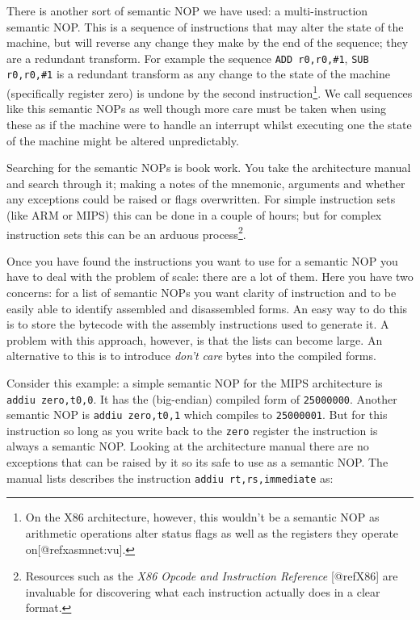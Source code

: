 \documentclass[10pt,]{book}
\begin{document}
There is another sort of semantic NOP we have used: a multi-instruction
semantic NOP. This is a sequence of instructions that may alter the
state of the machine, but will reverse any change they make by the end
of the sequence; they are a redundant transform. For example the
sequence \lstinline!ADD r0,r0,#1!, \lstinline!SUB r0,r0,#1! is a
redundant transform as any change to the state of the machine
(specifically register zero) is undone by the second
instruction\footnote{On the X86
  architecture\autocite{IntelCorporation:1997ta}, however, this wouldn't
  be a semantic NOP as arithmetic operations alter status flags as well
  as the registers they operate on{[}@refxasmnet:vu{]}.}. We call
sequences like this semantic NOPs as well though more care must be taken
when using these as if the machine were to handle an interrupt whilst
executing one the state of the machine might be altered unpredictably.

Searching for the semantic NOPs is book work. You take the architecture
manual and search through it; making a notes of the mnemonic, arguments
and whether any exceptions could be raised or flags overwritten. For
simple instruction sets (like ARM or MIPS) this can be done in a couple
of hours; but for complex instruction sets this can be an arduous
process\footnote{Resources such as the \emph{X86 Opcode and Instruction
  Reference} {[}@refX86{]} are invaluable for discovering what each
  instruction actually does in a clear format.}.

Once you have found the instructions you want to use for a semantic NOP
you have to deal with the problem of scale: there are a lot of them.
Here you have two concerns: for a list of semantic NOPs you want clarity
of instruction and to be easily able to identify assembled and
disassembled forms. An easy way to do this is to store the bytecode with
the assembly instructions used to generate it. A problem with this
approach, however, is that the lists can become large. An alternative to
this is to introduce \emph{don't care} bytes into the compiled forms.

Consider this example: a simple semantic NOP for the MIPS architecture
is \lstinline!addiu zero,t0,0!. It has the (big-endian) compiled form of
\lstinline!25000000!. Another semantic NOP is
\lstinline!addiu zero,t0,1! which compiles to \lstinline!25000001!. But
for this instruction so long as you write back to the \lstinline!zero!
register the instruction is always a semantic NOP. Looking at the
architecture manual\autocite{MIPSTechnologiesInc:2011ta} there are no
exceptions that can be raised by it so its safe to use as a semantic
NOP. The manual lists describes the instruction
\lstinline!addiu rt,rs,immediate! as:
\end{document}
